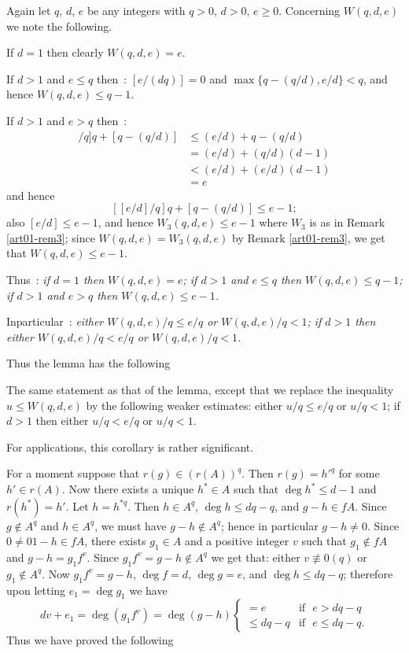 \begin{remark}\label{art01-rem5}
Again let $q$, $d$, $e$ be any integers with $q>0$, $d>0$, $e\geq 0$. Concerning $W(q,d,e)$ we note the following.

If $d=1$ then clearly $W(q,d,e)=e$.

If $d>1$ and $e\leq q$ then~: $[e/(dq)]=0$ and $\max\{q-(q/d),e/d\}<q$, and hence $W(q,d,e)\leq q-1$.

If $d>1$ and $e>q$ then~:
\begin{align*}
[[e/d]/q]q+[q-(q/d)] &\leq (e/d)+q-(q/d)\\
                     &= (e/d)+(q/d)(d-1)\\
                     &< (e/d)+(e/d)(d-1)\\
                     &= e
\end{align*}
and hence
$$
[[e/d]/q]q+[q-(q/d)]\leq e-1;
$$
also $[e/d]\leq e-1$, and hence $W_{3}(q,d,e)\leq e-1$ where $W_{3}$ is as in Remark \ref{art01-rem3}; since $W(q,d,e)=W_{3}(q,d,e)$ by Remark \ref{art01-rem3}, we get that $W(q,d,e)\leq e-1$.

Thus~: {\em if $d=1$ then $W(q,d,e)=e$; if $d>1$ and $e\leq q$ then $W(q,d,e)\leq q-1$; if $d>1$ and $e>q$ then $W(q,d,e)\leq e-1$.}

In\pageoriginale particular~: {\em either $W(q,d,e)/q\leq e/q$ or $W(q,d,e)/q<1$; if $d>1$ then either $W(q,d,e)/q<e/q$ or $W(q,d,e)/q<1$.}
\end{remark}

Thus the lemma has the following

\begin{coro*}
The same statement as that of the lemma, except that we replace the inequality $u\leq W(q,d,e)$ by the following weaker estimates: either $u/q\leq e/q$ or $u/q<1$; if $d>1$ then either $u/q<e/q$ or $u/q<1$.
\end{coro*}

For applications, this corollary is rather significant.

\begin{remark}\label{art01-rem6}
For a moment suppose that $r(g)\in (r(A))^{q}$. Then $r(g)={h'}^{q}$ for some $h'\in r(A)$. Now there exists a unique $h^{*}\in A$ such that $\deg h^{*}\leq d-1$ and $r(h^{*})=h'$. Let $h=h^{*q}$. Then $h\in A^{q}$, $\deg h\leq dq-q$, and $g-h\in fA$. Since $g\not\in A^{q}$ and $h\in A^{q}$, we must have $g-h\not\in A^{q}$; hence in particular $g-h\neq 0$. Since $0\neq 01-h\in fA$, there exists $g_{1}\in A$ and a positive integer $v$ such that $g_{1}\not\in fA$ and $g-h=g_{1}f^{v}$. Since $g_{1}f^{v}=g-h\not\in A^{q}$ we get that: either $v\nequiv 0(q)$ or $g_{1}\not\in A^{q}$. Now $g_{1}f^{v}=g-h$, $\deg f=d$, $\deg g=e$, and $\deg h\leq dq-q$; therefore upon letting $e_{1}=\deg g_{1}$ we have
$$
dv+e_{1}=\deg (g_{1}f^{v})=\deg(g-h)
\left\{
\begin{array}{ll}
=e & \text{if~ } e>dq-q\\
\leq dq-q & \text{if~ } e\leq dq-q.
\end{array}\right.
$$
Thus we have proved the following
\end{remark}

